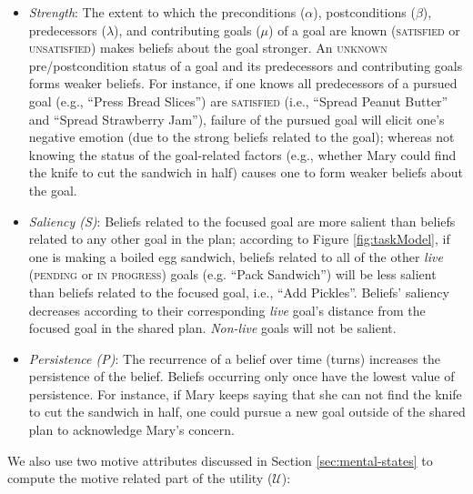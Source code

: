 \documentclass{article}
\begin{document}
\vspace*{-2mm}
\begin{itemize}[leftmargin=2pt]
  \setlength\itemsep{0.025mm}
  \item \textit{Strength}: The extent to which the preconditions ($\alpha$),
  postconditions ($\beta$), predecessors ($\lambda$), and contributing goals
  ($\mu$) of a goal are known (\textsc{satisfied} or \textsc{unsatisfied}) makes
  beliefs about the goal stronger. An \textsc{unknown} pre/postcondition status
  of a goal and its predecessors and contributing goals forms weaker beliefs.
  For instance, if one knows all predecessors of a pursued goal (e.g., ``Press
  Bread Slices'') are \textsc{satisfied} (i.e., ``Spread Peanut Butter'' and
  ``Spread Strawberry Jam''), failure of the pursued goal will elicit one's
  negative emotion (due to the strong beliefs related to the goal); whereas not
  knowing the status of the goal-related factors (e.g., whether Mary could find
  the knife to cut the sandwich in half) causes one to form weaker beliefs about
  the goal.
  \item \textit{Saliency (S)}: Beliefs related to the focused goal are more
  salient than beliefs related to any other goal in the plan; according to
  Figure \ref{fig:taskModel}, if one is making a boiled egg sandwich, beliefs
  related to all of the other \textit{live} (\textsc{pending} or \textsc{in
  progress}) goals (e.g. ``Pack Sandwich'') will be less salient than beliefs
  related to the focused goal, i.e., ``Add Pickles''. Beliefs' saliency
  decreases according to their corresponding \textit{live} goal's distance from
  the focused goal in the shared plan. \textit{Non-live} goals will not be
  salient.
  \item \textit{Persistence (P)}: The recurrence of a belief over time (turns)
  increases the persistence of the belief. Beliefs occurring only once have the
  lowest value of persistence. For instance, if Mary keeps saying that she can
  not find the knife to cut the sandwich in half, one could pursue a new goal
  outside of the shared plan to acknowledge Mary's concern.
\end{itemize}

\vspace*{-1mm}
\noindent We also use two motive attributes discussed in Section
\ref{sec:mental-states} to compute the motive related part of the utility
($\mathcal{U}$):
\end{document}
